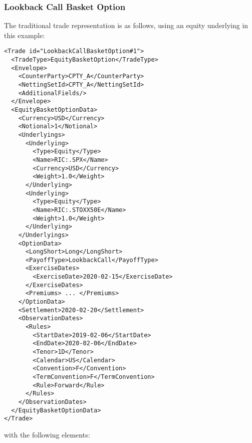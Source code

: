 \subsubsection*{Lookback Call Basket Option}

The traditional trade representation is as follows, using an equity underlying in this example:

\begin{verbatim}
<Trade id="LookbackCallBasketOption#1">
  <TradeType>EquityBasketOption</TradeType>
  <Envelope>
    <CounterParty>CPTY_A</CounterParty>
    <NettingSetId>CPTY_A</NettingSetId>
    <AdditionalFields/>
  </Envelope>
  <EquityBasketOptionData>
    <Currency>USD</Currency>
    <Notional>1</Notional>
    <Underlyings>
      <Underlying>
        <Type>Equity</Type>
        <Name>RIC:.SPX</Name>
        <Currency>USD</Currency>
        <Weight>1.0</Weight>
      </Underlying>
      <Underlying>
        <Type>Equity</Type>
        <Name>RIC:.STOXX50E</Name>
        <Weight>1.0</Weight>
      </Underlying>
    </Underlyings>
    <OptionData>
      <LongShort>Long</LongShort>
      <PayoffType>LookbackCall</PayoffType>
      <ExerciseDates>
        <ExerciseDate>2020-02-15</ExerciseDate>
      </ExerciseDates>
      <Premiums> ... </Premiums>  
    </OptionData>
    <Settlement>2020-02-20</Settlement>
    <ObservationDates>
      <Rules>
        <StartDate>2019-02-06</StartDate>
        <EndDate>2020-02-06</EndDate>
        <Tenor>1D</Tenor>
        <Calendar>US</Calendar>
        <Convention>F</Convention>
        <TermConvention>F</TermConvention>
        <Rule>Forward</Rule>
      </Rules>
    </ObservationDates>
  </EquityBasketOptionData>
</Trade>
\end{verbatim}

with the following elements:

